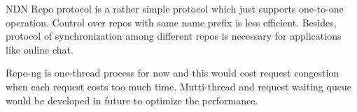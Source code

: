 \documentclass{acm_proc_article-sp}
\begin{document}
NDN Repo protocol is a rather simple protocol which just supports one-to-one operation. Control over repos with same name prefix is less efficient. Besides, protocol of synchronization among different repos is necessary for applications like online chat.

Repo-ng is one-thread process for now and this would cost request congestion when each request costs too much time. Mutti-thread and request waiting queue would be developed in future to optimize the performance.



\end{document}
